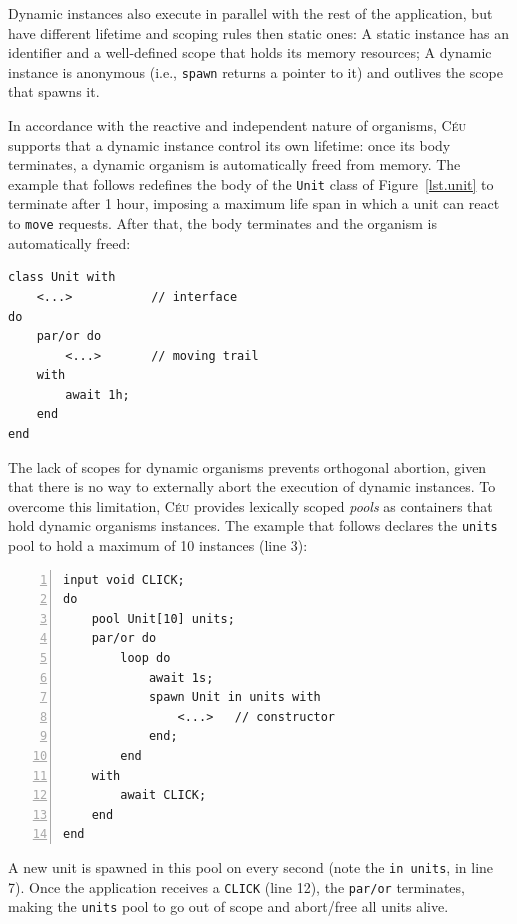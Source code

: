 \documentclass{acm_proc_article-sp}
\newcommand{\CEU}{\textsc{C\'{e}u}\xspace}
\newcommand{\code}[1] {{\small{\texttt{#1}}}}
\newcommand{\1}{\;}
\newcommand{\2}{\;\;}
\newcommand{\3}{\;\;\;}
\newcommand{\5}{\;\;\;\;\;}
\begin{document}
Dynamic instances also execute in parallel with the rest of the application, 
but have different lifetime and scoping rules then static ones:
%
A static instance has an identifier and a well-defined scope that holds its 
memory resources;
A dynamic instance is anonymous (i.e., \code{spawn} returns a pointer to it) 
and outlives the scope that spawns it.

In accordance with the reactive and independent nature of organisms, \CEU 
supports that a dynamic instance control its own lifetime:
once its body terminates, a dynamic organism is automatically freed from 
memory.
%
The example that follows redefines the body of the \code{Unit} class of 
Figure~\ref{lst.unit} to terminate after 1 hour, imposing a maximum life span 
in which a unit can react to \code{move} requests.
After that, the body terminates and the organism is automatically freed:

\begin{lstlisting}
class Unit with
    <...>           // interface
do
    par/or do
        <...>       // moving trail
    with
        await 1h;
    end
end
\end{lstlisting}

The lack of scopes for dynamic organisms prevents orthogonal abortion, given 
that there is no way to externally abort the execution of dynamic instances.
%
To overcome this limitation, \CEU provides lexically scoped \emph{pools} as 
containers that hold dynamic organisms instances.
%
The example that follows declares the \code{units} pool to hold a maximum of 10 
instances (line 3):

\begin{lstlisting}[numbers=left,xleftmargin=3em]
input void CLICK;
do
    pool Unit[10] units;
    par/or do
        loop do
            await 1s;
            spawn Unit in units with
                <...>   // constructor
            end;
        end
    with
        await CLICK;
    end
end
\end{lstlisting}

A new unit is spawned in this pool on every second (note the \code{in units}, 
in line 7).
Once the application receives a \code{CLICK} (line 12), the \code{par/or} 
terminates, making the \code{units} pool to go out of scope and abort/free all 
units alive.
\end{document}

